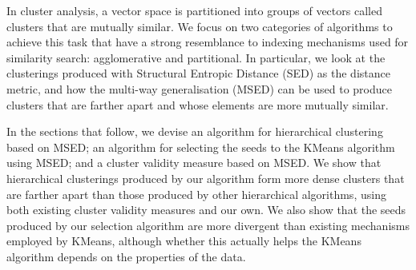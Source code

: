 In cluster analysis, a vector space is partitioned into groups of vectors called clusters that are mutually similar.  
We focus on two categories of algorithms to achieve this task that have a strong resemblance to indexing mechanisms used for similarity search:  agglomerative and partitional.  
In particular, we look at the clusterings produced with Structural Entropic Distance (SED)\cite{Connor:2011} as the distance metric, and how the multi-way generalisation (MSED)\cite{Moss:2013} can be used to produce clusters that are farther apart and whose elements are more mutually similar.

In the sections that follow, we devise an algorithm for hierarchical clustering based on MSED; an algorithm for selecting the seeds to the KMeans algorithm using MSED; and a cluster validity measure based on MSED.  
We show that hierarchical clusterings produced by our algorithm form more dense clusters that are farther apart than those produced by other hierarchical algorithms, using both existing cluster validity measures and our own.  
We also show that the seeds produced by our selection algorithm are more divergent than existing mechanisms employed by KMeans, although whether this actually helps the KMeans algorithm depends on the properties of the data.

